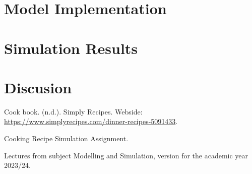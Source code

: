 \documentclass[a4paper,11pt]{scrartcl}
\begin{document}
\newpage

\section{Model Implementation}


\newpage
\section{Simulation Results}


\newpage
\section{Discusion}


\newpage

%
\begin{thebibliography}{1}
  Cook book. (n.d.). Simply Recipes. Webside: \url{https://www.simplyrecipes.com/dinner-recipes-5091433}.

  Cooking Recipe Simulation Assignment. 

  Lectures from subject Modelling and Simulation, version for the academic year 2023/24.
\end{thebibliography}
%
\end{document}
